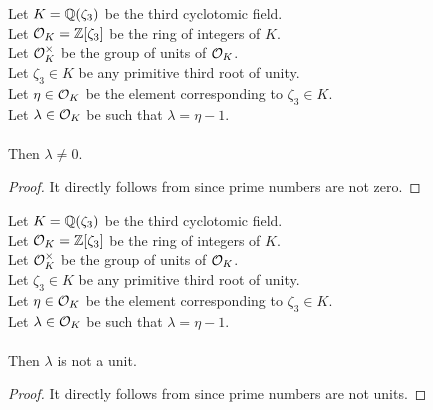 \begin{lemma}
    \label{lmm:lambda_ne_zero}
    \leanok
    Let $K = \mathbb{Q}(\zeta_3)$ be the third cyclotomic field. \\
    Let $\mathcal{O}_K = \mathbb{Z}[\zeta_3]$ be the ring of integers of $K$. \\
    Let $\mathcal{O}^\times_K$ be the group of units of $\mathcal{O}_K$. \\
    Let $\zeta_3 \in K$ be any primitive third root of unity. \\
    Let $\eta \in \mathcal{O}_K$ be the element corresponding to $\zeta_3 \in K$. \\
    Let $\lambda \in \mathcal{O}_K$ be such that $\lambda = \eta -1$. \\\\
    Then $\lambda \neq 0$.
\end{lemma}
\begin{proof}
    \leanok
    It directly follows from  since prime numbers are not zero.
\end{proof}

\begin{lemma}
    \label{lmm:lambda_not_unit}
    \leanok
    Let $K = \mathbb{Q}(\zeta_3)$ be the third cyclotomic field. \\
    Let $\mathcal{O}_K = \mathbb{Z}[\zeta_3]$ be the ring of integers of $K$. \\
    Let $\mathcal{O}^\times_K$ be the group of units of $\mathcal{O}_K$. \\
    Let $\zeta_3 \in K$ be any primitive third root of unity. \\
    Let $\eta \in \mathcal{O}_K$ be the element corresponding to $\zeta_3 \in K$. \\
    Let $\lambda \in \mathcal{O}_K$ be such that $\lambda = \eta -1$. \\\\
    Then $\lambda$ is not a unit.
\end{lemma}
\begin{proof}
    \leanok
    It directly follows from  since prime numbers are not units.
\end{proof}

